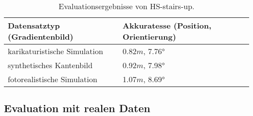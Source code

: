 \begin{table}
	\centering
	\caption{Evaluationsergebnisse von HS-stairs-up.}
	\begin{tabularx}{0.75\textwidth}{X X}\textbf{Datensatztyp} \hspace{2cm} (Gradientenbild)& \textbf{Akkuratesse} \hspace{2cm} (Position, Orientierung)\\
		\hline
		karikaturistische Simulation & 0.82$m$, 7.76°\\
		\hline
		synthetisches Kantenbild & 0.92$m$, 7.98°\\
		\hline
		fotorealistische Simulation & 1.07$m$, 8.69°\\
	\end{tabularx}
	\label{tab:synth_icloop}
\end{table}
\subsection{Evaluation mit realen Daten}